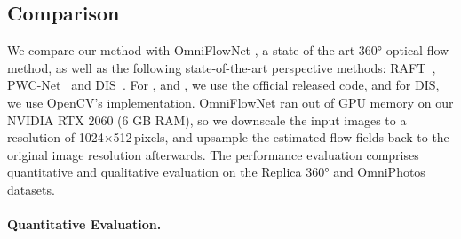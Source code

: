

\subsection{Comparison}

We compare our method with OmniFlowNet \cite{ArtizZAD2020}, a state-of-the-art 360° optical flow method, as well as the following state-of-the-art perspective methods: RAFT~\cite{TeedD2020a}, PWC-Net~\cite{SunYLK2018} and DIS~\cite{KroegTDV2016}.
%
For ,  and , we use the official released code, and for DIS, we use OpenCV's implementation.
% 
OmniFlowNet ran out of GPU memory on our NVIDIA RTX 2060 (6 GB RAM), so we downscale the input images to a resolution of 1024$\times$512\,pixels, and upsample the estimated flow fields back to the original image resolution afterwards.
%
The performance evaluation comprises quantitative and qualitative evaluation on the Replica 360° and OmniPhotos datasets.

\vspace{-1em}
\paragraph{Quantitative Evaluation.}

